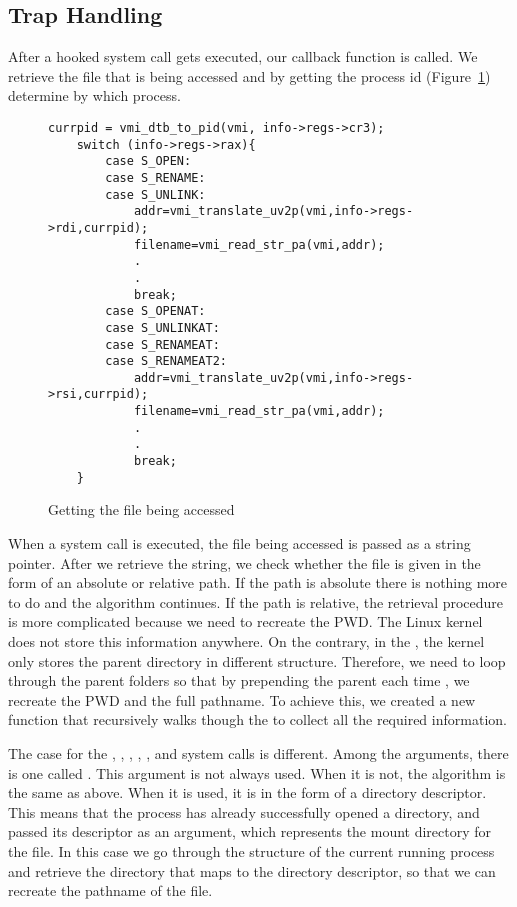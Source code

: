 \subsection{Trap Handling}\label{sub:handling}

After a hooked system call gets executed, our callback function is called. We retrieve the file that is being accessed and by getting the  process id (Figure~\ref{fig:getfile}) determine by which process. 

\begin{figure}[ht]
\selectfont
\begin{lstlisting}[style=CStyle]
	currpid = vmi_dtb_to_pid(vmi, info->regs->cr3);
	switch (info->regs->rax){
		case S_OPEN:
		case S_RENAME:
		case S_UNLINK:
			addr=vmi_translate_uv2p(vmi,info->regs->rdi,currpid);
			filename=vmi_read_str_pa(vmi,addr);
			.
			.
			break;
		case S_OPENAT:
		case S_UNLINKAT:
		case S_RENAMEAT:
		case S_RENAMEAT2:
			addr=vmi_translate_uv2p(vmi,info->regs->rsi,currpid);
			filename=vmi_read_str_pa(vmi,addr);
			.
			.
			break;	
	}
\end{lstlisting}
	\caption{Getting the file being accessed}
	\label{fig:getfile}
\end{figure}


\par When a system call is executed, the file being accessed is passed as a string pointer. After we retrieve the string, we check whether the file is given in the form of an absolute or relative path. If the path is absolute there is nothing more to do and the algorithm continues. If the path is relative, the retrieval procedure is more complicated because we need to recreate the \ac{PWD}. The Linux kernel does not store this information anywhere. On the contrary, in the , the kernel only stores the parent directory in different structure. Therefore, we need to loop through the parent folders so that by prepending the parent each time , we recreate the \ac{PWD} and the full pathname. To achieve this, we created a new function that recursively walks though the  to collect all the required information. 

\par The case for the , , , , , and  system calls is different. Among the arguments, there is one called . This argument is not always used. When it is not, the algorithm is the same as above. When it is used, it is in the form of a directory descriptor. This means that the process has already successfully opened a directory, and passed its descriptor as an argument, which represents the mount directory for the file. In this case we go through the  structure of the current running process and retrieve the directory that maps to the directory descriptor, so that we can recreate the pathname of the file.


